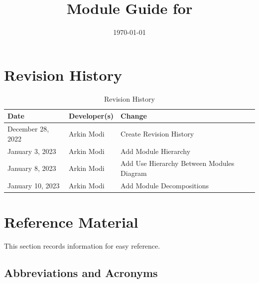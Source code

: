 \documentclass[12pt, titlepage]{article}
\begin{document}
\title{Module Guide for \progname{}}
\author{\authname}
\date{\today}

\maketitle


\section{Revision History}

\begin{table}[hp]
	\caption{Revision History} \label{TblRevisionHistory}
	\begin{tabularx}{\textwidth}{llX}
		\toprule
		\textbf{Date}     & \textbf{Developer(s)} & \textbf{Change}                           \\
		\midrule
		December 28, 2022 & Arkin Modi            & Create Revision History                   \\
		January 3, 2023   & Arkin Modi            & Add Module Hierarchy                      \\
		January 8, 2023   & Arkin Modi            & Add Use Hierarchy Between Modules Diagram \\
		January 10, 2023  & Arkin Modi            & Add Module Decompositions                 \\
		\bottomrule
	\end{tabularx}
\end{table}

\newpage

\section{Reference Material}

This section records information for easy reference.

\subsection{Abbreviations and Acronyms}
\end{document}
